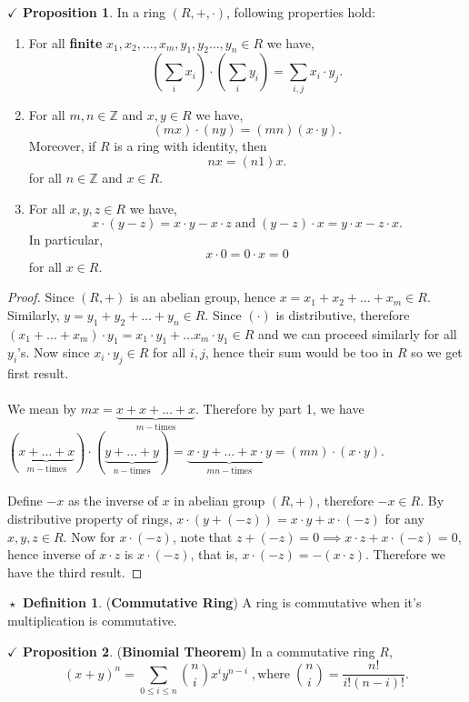 \documentclass{article}
\theoremstyle{definition}
\newtheorem{definition}{$\boxed{\star}$ Definition}
\theoremstyle{remark}
\theoremstyle{definition}
\theoremstyle{definition}
\newtheorem{proposition}{$\checkmark$ Proposition}
\theoremstyle{definition}
\theoremstyle{proof}
\begin{document}
\begin{proposition}
	In a ring $ (R,+,\cdot) $, following properties hold:
	\begin{enumerate}
		\item{For all \textbf{finite} $ x_1,x_2,\dots,x_m,y_1,y_2\dots,y_n \in R $ we have,
	\[\left ( \sum_i x_i\right )\cdot\left (\sum_i y_i\right )= \sum_{i,j}x_i\cdot y_j.\]	
	}
		\item{For all $ m,n\in \mathbb{Z} $ and $ x,y \in R $ we have,
	\[(mx)\cdot (ny) = (mn)(x\cdot y).\]	
Moreover, if $ R $ is a ring with identity, then
\[nx = (n1)x.\]	
for all $ n\in \mathbb{Z} $ and $ x\in R $.
}
\item{For all $ x,y,z\in R $ we have,
\[x\cdot(y-z) = x\cdot y - x\cdot z\;\text{and}\;(y-z)\cdot x = y\cdot x - z\cdot x.\]
In particular, 
\[x\cdot 0 = 0\cdot x = 0\]
for all $ x\in R $.
}
	\end{enumerate}
\end{proposition}
\begin{proof}
	Since $ (R,+) $ is an abelian group, hence $x= x_1+x_2+\dots +x_m \in R$. Similarly, $y= y_1+y_2+\dots + y_n \in R$. Since $ (\cdot) $ is distributive, therefore $ (x_1+\dots+x_m)\cdot y_1 = x_1\cdot y_1+\dots x_m\cdot y_1 \in R $ and we can proceed similarly for all $ y_i $'s. Now since $ x_i\cdot y_j \in R$ for all $ i, j $, hence their sum would be too in $ R $ so we get first result.\\\\
	We mean by $ mx  = \underbrace{x+x+\dots +x}_{m-\text{times}}$. Therefore by part 1, we have $ (\underbrace{x+\dots+x}_{m-\text{times}}) \cdot (\underbrace{y+\dots+y}_{n-\text{times}}) = \underbrace{x\cdot y+\dots+x\cdot y}_{mn-\text{times}} = (mn)\cdot (x\cdot y)$.\\\\
	Define $ -x $ as the inverse of $ x $ in abelian group $ (R,+) $, therefore $ -x \in R $. By distributive property of rings, $ x\cdot (y + (-z)) = x\cdot y + x\cdot (-z)$ for any $ x,y,z\in R $. Now for $ x\cdot (-z) $, note that $ z + (-z) = 0 \implies x\cdot z + x\cdot (-z) = 0$, hence inverse of $ x\cdot z $ is $ x\cdot (-z)$, that is, $ x\cdot (-z) = -(x\cdot z) $. Therefore we have the third result. 
\end{proof}
\hrulefill
\newpage
\begin{definition}
		(\textbf{Commutative Ring}) A ring is commutative when it's multiplication is commutative.
\end{definition}
\hrulefill
\begin{proposition}
	(\textbf{Binomial Theorem}) In a commutative ring $ R $,
	\[(x+y)^n = \sum_{0\le i\le n} {n\choose{i}} x^i y^{n-i}\;,\text{where}\; {n\choose{i}} = \frac{n!}{i!(n-i)!}.\]
\end{proposition}
\end{document}
